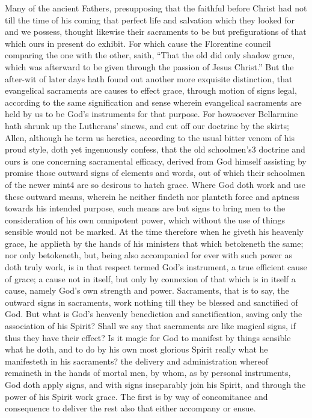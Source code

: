Many of the ancient Fathers, presupposing that the faithful before Christ had not till the time of his coming that perfect life and salvation which they looked for and we possess, thought likewise their sacraments to be but prefigurations of that which ours in present do exhibit. For which cause the Florentine council comparing the one with the other, saith, “That the old did only shadow grace, which was afterward to be given through the passion of Jesus Christ.” But the after-wit of later days hath found out another more exquisite distinction, that evangelical sacraments are causes to effect grace, through motion of signs legal, according to the same signification and sense wherein evangelical sacraments are held by us to be God’s instruments for that purpose. For howsoever Bellarmine hath shrunk up the Lutherans’ sinews, and cut off our doctrine by the skirts; Allen, although he term us heretics, according to the usual bitter venom of his proud style, doth yet ingenuously confess, that the old schoolmen’s3 doctrine and ours is one concerning sacramental efficacy, derived from God himself assisting by promise those outward signs of elements and words, out of which their schoolmen of the newer mint4 are so desirous to hatch grace. Where God doth work and use these outward means, wherein he neither findeth nor planteth force and aptness towards his intended purpose, such means are but signs to bring men to  the consideration of his own omnipotent power, which without the use of things sensible would not be marked. At the time therefore when he giveth his heavenly grace, he applieth by the hands of his ministers that which betokeneth the same; nor only betokeneth, but, being also accompanied for ever with such power as doth truly work, is in that respect termed God’s instrument, a true efficient cause of grace; a cause not in itself, but only by connexion of that which is in itself a cause, namely God’s own strength and power. Sacraments, that is to say, the outward signs in sacraments, work nothing till they be blessed and sanctified of God. But what is God’s heavenly benediction and sanctification, saving only the association of his Spirit? Shall we say that sacraments are like magical signs, if thus they have their effect? Is it magic for God to manifest by things sensible what he doth, and to do by his own most glorious Spirit really what he manifesteth in his sacraments? the delivery and administration whereof remaineth in the hands of mortal men, by whom, as by personal instruments, God doth apply signs, and with signs inseparably join his Spirit, and through the power of his Spirit work grace. The first is by way of concomitance and consequence to deliver the rest also that either accompany or ensue.

